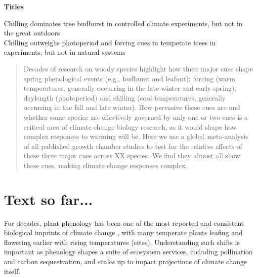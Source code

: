 \documentclass[11pt,letter]{article}
\begin{document}
%

\renewcommand{\refname}{\CHead{}}


{\bf Titles}

Chilling dominates tree budburst in controlled climate experiments, but not in the great outdoors\\
Chilling outweighs photoperiod and forcing cues in temperate trees in experiments, but not in natural systems


\begin{abstract}
Decades of research on woody species highlight how three major cues shape spring phenological events (e.g., budburst and leafout): forcing (warm temperatures, generally occurring in the late winter and early spring), daylength (photoperiod) and chilling (cool temperatures, generally occurring in the fall and late winter). How pervasive these cues are and whether some species are effectively governed by only one or two cues is a critical area of climate change biology research, as it would shape how complex responses to warming will be. Here we use a global meta-analysis of all published growth chamber studies to test for the relative effects of these three major cues across XX species. We find they almost all show these cues, making climate change responses complex. 
\end{abstract}

\section* {Text so far...}

\par For decades, plant phenology has been one of the most reported and consistent biological imprints of climate change \citep{IPCC:2014sm}, with many temperate plants leafing and flowering earlier with rising temperatures (cites). Understanding such shifts is important as phenology shapes a suite of ecosystem services, including pollination and carbon sequestration, and scales up to impact projections of climate change itself. 
\end{document}
